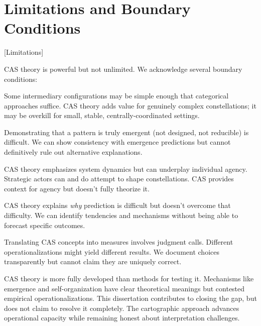 \documentclass[../main.tex]{subfiles}
\begin{document}
\section{Limitations and Boundary Conditions}[Limitations]

CAS theory is powerful but not unlimited. We acknowledge several boundary conditions:

\begin{description}[leftmargin=0.5cm, itemsep=0.4em]
\item[Not all systems are equally complex.] Some intermediary configurations may be simple enough that categorical approaches suffice. CAS theory adds value for genuinely complex constellations; it may be overkill for small, stable, centrally-coordinated settings.

\item[Emergence is hard to prove.] Demonstrating that a pattern is truly emergent (not designed, not reducible) is difficult. We can show consistency with emergence predictions but cannot definitively rule out alternative explanations.

\item[Agency remains underspecified.] CAS theory emphasizes system dynamics but can underplay individual agency. Strategic actors can and do attempt to shape constellations. CAS provides context for agency but doesn't fully theorize it.

\item[Prediction remains limited.] CAS theory explains \emph{why} prediction is difficult but doesn't overcome that difficulty. We can identify tendencies and mechanisms without being able to forecast specific outcomes.

\item[Operationalization requires choices.] Translating CAS concepts into measures involves judgment calls. Different operationalizations might yield different results. We document choices transparently but cannot claim they are uniquely correct.
\end{description}

\begin{criticalbox}
CAS theory is more fully developed than methods for testing it. Mechanisms like emergence and self-organization have clear theoretical meanings but contested empirical operationalizations. This dissertation contributes to closing the gap, but does not claim to resolve it completely. The cartographic approach advances operational capacity while remaining honest about interpretation challenges.
\end{criticalbox}
\end{document}

